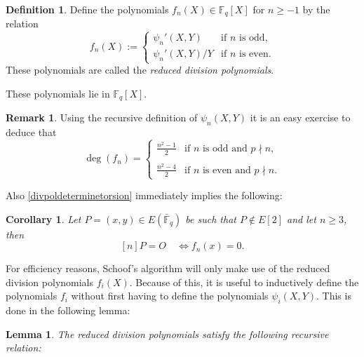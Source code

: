 \documentclass{article}
\numberwithin{equation}{section}
\newtheorem{lemma}[theorem]{Lemma}
\newtheorem{corollary}[theorem]{Corollary}
\theoremstyle{definition}
\newtheorem{definition}[theorem]{Definition}
\newtheorem{remark}[theorem]{Remark}
\newcommand{\FF}[1]{{\mathbb F}_{#1}} %
\newcommand{\FFCL}[1]{{\bar {\mathbb F}}_{#1}} %
\newcommand{\degree}[1]{\operatorname{deg} \left(#1\right)} %
\begin{document}
\begin{definition}\label{reduceddivpol}
Define the polynomials $f_n(X) \in \FF{q}[X]$ for $n \geq -1$ by the relation
$$f_n(X):=\left \{ \begin{array}{ll} \psi_n'(X,Y) &\text{if } n \text{ is odd,}\\ \psi_n'(X,Y)/Y &\text{if } n \text{ is even.} \end{array}$$ These polynomials are called the \emph{reduced division polynomials}.
\end{definition}

These polynomials lie in $\FF{q}[X]$.

\begin{remark}\label{degreedivpol}
Using the recursive definition of $\psi_n(X,Y)$ it is an easy exercise to deduce that $$\degree{f_n}=\left \{ \begin{array}{ll} \frac{n^2-1}{2} & \text{if } n \text{ is odd and } p \nmid n, \\ \\ \frac{n^2-4}{2} & \text{if } n \text{ is even and } p \nmid n. \end{array}$$
\end{remark}

Also \ref{divpoldeterminetorsion} immediately implies the following:

\begin{corollary}
Let $P = (x,y) \in E(\FFCL{q})$ be such that $P \not \in E[2]$ and let $n \geq 3$, then $$[n]P = O \quad \Leftrightarrow f_n(x)=0.$$
\end{corollary}

For efficiency reasons, Schoof's algorithm will only make use of the reduced division polynomials $f_i(X)$. Because of this, it is useful to inductively define the polynomials $f_i$ without first having to define the polynomials $\psi_i(X,Y)$. This is done in the following lemma:

\begin{lemma}\label{constructiondivpol}
The reduced division polynomials satisfy the following recursive relation:
\begin{itemize}
\item $f_{-1}(X)=-1,\quad f_0(X)=0,\quad f_1(X)=1,\quad f_2(X)=2,$
\item $f_{3}(X)=3X^4+6AX^2+12BX-A^2,$
\item $f_4}(X)=4(X^6+5AX^4+20BX^3-5A^2X^2-4ABX-8B^2-A^3),$
\item $f_{2n}(X)= \mathlarger{\frac{f_n(f_{n+2}f_{n-1}^2-f_{n-2}f_{n+1}^2)}{2}} \quad (n \geq 3),$
\item $f_{2n+1}(X)= \left \{ \begin{array}{ll} (X^3+AX+B)^2f_{n+2}f_n^3-f_{n+1}^3f_{n-1} &\text{if } n \text{ is even,} \\ \\ f_{n+2}f_n^3 - (X^3+AX+B)^2f_{n+1}^3f_{n-1} & \text{if } n \text{ is odd,}  \end{array} \quad (n \geq 2).$
\end{itemize}
\end{lemma}
\end{document}
